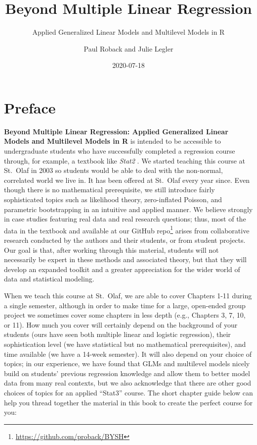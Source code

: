 \documentclass[
]{krantz}
\title{Beyond Multiple Linear Regression}
\subtitle{Applied Generalized Linear Models and Multilevel Models in R}
\author{Paul Roback and Julie Legler}
\date{2020-07-18}
\renewcommand{\href}[2]{#2\footnote{\url{#1}}}
\begin{document}
\maketitle


\thispagestyle{empty}

\setlength{\abovedisplayskip}{-5pt}
\setlength{\abovedisplayshortskip}{-5pt}

{
\hypersetup{linkcolor=}
\setcounter{tocdepth}{2}
\tableofcontents
}
\mainmatter

\hypertarget{preface}{%
\chapter*{Preface}\label{preface}}


\textbf{Beyond Multiple Linear Regression: Applied Generalized Linear Models and Multilevel Models in R} \citep{RProject} is intended to be accessible to undergraduate students who have successfully completed a regression course through, for example, a textbook like \emph{Stat2} \citep{Cannon2019}. We started teaching this course at St.~Olaf in 2003 so students would be able to deal with the non-normal, correlated world we live in. It has been offered at St.~Olaf every year since. Even though there is no mathematical prerequisite, we still introduce fairly sophisticated topics such as likelihood theory, zero-inflated Poisson, and parametric bootstrapping in an intuitive and applied manner. We believe strongly in case studies featuring real data and real research questions; thus, most of the data in the textbook and \href{https://github.com/proback/BYSH}{available at our GitHub repo} arises from collaborative research conducted by the authors and their students, or from student projects. Our goal is that, after working through this material, students will not necessarily be expert in these methods and associated theory, but that they will develop an expanded toolkit and a greater appreciation for the wider world of data and statistical modeling.

When we teach this course at St.~Olaf, we are able to cover Chapters 1-11 during a single semester, although in order to make time for a large, open-ended group project we sometimes cover some chapters in less depth (e.g., Chapters 3, 7, 10, or 11). How much you cover will certainly depend on the background of your students (ours have seen both multiple linear and logistic regression), their sophistication level (we have statistical but no mathematical prerequisites), and time available (we have a 14-week semester). It will also depend on your choice of topics; in our experience, we have found that GLMs and multilevel models nicely build on students' previous regression knowledge and allow them to better model data from many real contexts, but we also acknowledge that there are other good choices of topics for an applied ``Stat3'' course. The short chapter guide below can help you thread together the material in this book to create the perfect course for you:
\end{document}
